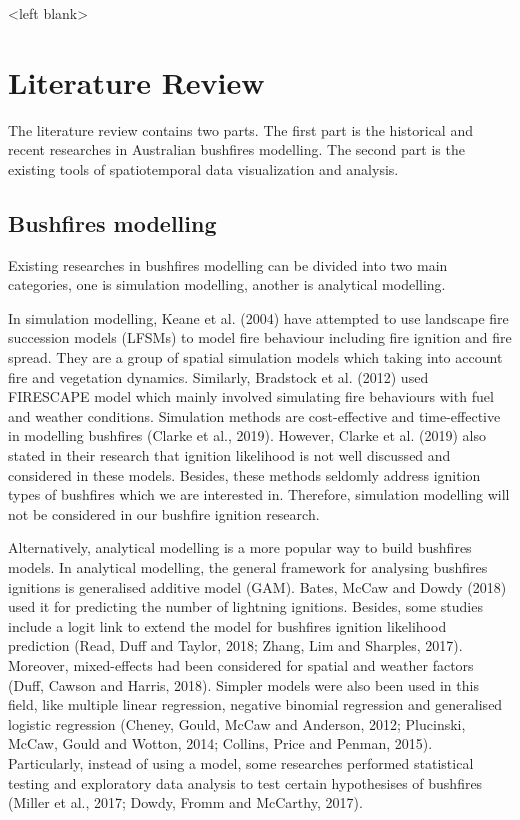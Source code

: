 \documentclass{monashthesis}
\begin{document}
\textless{}left blank\textgreater{}

\chapter{Literature Review}\label{literature-review}

The literature review contains two parts. The first part is the
historical and recent researches in Australian bushfires modelling. The
second part is the existing tools of spatiotemporal data visualization
and analysis.

\section{Bushfires modelling}\label{bushfires-modelling}

Existing researches in bushfires modelling can be divided into two main
categories, one is simulation modelling, another is analytical
modelling.

In simulation modelling, Keane et al. (2004) have attempted to use
landscape fire succession models (LFSMs) to model fire behaviour
including fire ignition and fire spread. They are a group of spatial
simulation models which taking into account fire and vegetation
dynamics. Similarly, Bradstock et al. (2012) used FIRESCAPE model which
mainly involved simulating fire behaviours with fuel and weather
conditions. Simulation methods are cost-effective and time-effective in
modelling bushfires (Clarke et al., 2019). However, Clarke et al. (2019)
also stated in their research that ignition likelihood is not well
discussed and considered in these models. Besides, these methods
seldomly address ignition types of bushfires which we are interested in.
Therefore, simulation modelling will not be considered in our bushfire
ignition research.

Alternatively, analytical modelling is a more popular way to build
bushfires models. In analytical modelling, the general framework for
analysing bushfires ignitions is generalised additive model (GAM).
Bates, McCaw and Dowdy (2018) used it for predicting the number of
lightning ignitions. Besides, some studies include a logit link to
extend the model for bushfires ignition likelihood prediction (Read,
Duff and Taylor, 2018; Zhang, Lim and Sharples, 2017). Moreover,
mixed-effects had been considered for spatial and weather factors (Duff,
Cawson and Harris, 2018). Simpler models were also been used in this
field, like multiple linear regression, negative binomial regression and
generalised logistic regression (Cheney, Gould, McCaw and Anderson,
2012; Plucinski, McCaw, Gould and Wotton, 2014; Collins, Price and
Penman, 2015). Particularly, instead of using a model, some researches
performed statistical testing and exploratory data analysis to test
certain hypothesises of bushfires (Miller et al., 2017; Dowdy, Fromm and
McCarthy, 2017).
\end{document}
